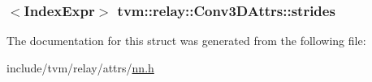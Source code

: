 \subsubsection[{\texorpdfstring{strides}{strides}}]{$<${\bf Index\+Expr}$>$ tvm\+::relay\+::\+Conv3\+D\+Attrs\+::strides}\hypertarget{structtvm_1_1relay_1_1Conv3DAttrs_a7b9605ae0760213edb101e1cee4cf371}{}\label{structtvm_1_1relay_1_1Conv3DAttrs_a7b9605ae0760213edb101e1cee4cf371}


The documentation for this struct was generated from the following file\+:\begin{DoxyCompactItemize}
\item 
include/tvm/relay/attrs/\hyperlink{include_2tvm_2relay_2attrs_2nn_8h}{nn.\+h}\end{DoxyCompactItemize}

